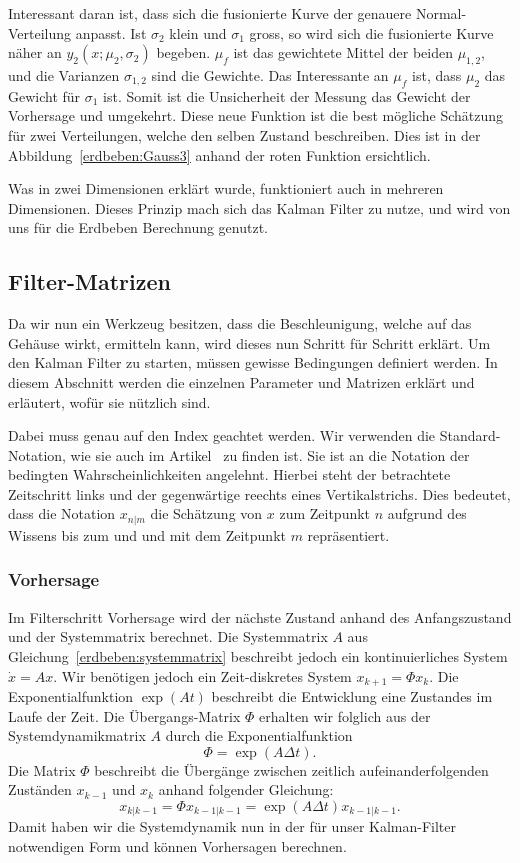 Interessant daran ist, dass sich die fusionierte Kurve der genauere Normal-Verteilung anpasst.
Ist ${\sigma_2}$ klein und ${\sigma_1}$ gross,
so wird sich die fusionierte Kurve näher an ${y_2}(x;{\mu_2},{\sigma_2})$ begeben.
$\mu_f$ ist das gewichtete Mittel der beiden $\mu_{1,2}$, und die Varianzen $\sigma_{1,2}$ sind die Gewichte.
Das Interessante an $\mu_{f}$ ist, dass ${\mu_2}$ das Gewicht für ${\sigma_1}$ ist. 
Somit ist die Unsicherheit der Messung das Gewicht der Vorhersage und umgekehrt.
Diese neue Funktion ist die best mögliche Schätzung für zwei Verteilungen, welche den selben Zustand beschreiben.
Dies ist in der Abbildung~\ref{erdbeben:Gauss3} anhand der roten Funktion ersichtlich. 

Was in zwei Dimensionen erklärt wurde, funktioniert auch in mehreren Dimensionen. 
Dieses Prinzip mach sich das Kalman Filter zu nutze, und wird von uns für die Erdbeben Berechnung genutzt. 

\subsection{Filter-Matrizen}
Da wir nun ein Werkzeug besitzen, dass die Beschleunigung, welche auf das Gehäuse wirkt, ermitteln kann, wird dieses nun Schritt für Schritt erklärt. 
Um den Kalman Filter zu starten, müssen gewisse Bedingungen definiert werden. 
In diesem Abschnitt werden die einzelnen Parameter und Matrizen erklärt und erläutert, wofür sie nützlich sind. 

Dabei muss genau auf den Index geachtet werden.
Wir verwenden die Standard-Notation, wie sie auch im Artikel~\cite{erdbeben:wikipedia} zu finden ist.
Sie ist an die Notation der bedingten Wahrscheinlichkeiten angelehnt.
Hierbei steht der betrachtete Zeitschritt links und der gegenwärtige reechts eines Vertikalstrichs.
Dies bedeutet, dass die Notation $x_{n|m}$ die Schätzung von $x$ zum Zeitpunkt $n$ aufgrund des Wissens bis zum und und mit dem Zeitpunkt $m$ repräsentiert.

\subsubsection*{Vorhersage}
Im Filterschritt Vorhersage wird der nächste Zustand anhand des Anfangszustand und der Systemmatrix berechnet. 
Die Systemmatrix $A$ aus Gleichung~\eqref{erdbeben:systemmatrix} beschreibt jedoch ein kontinuierliches System $\dot x = Ax$.
Wir benötigen jedoch ein Zeit-diskretes System $x_{k+1} = \Phi x_k$.
Die Exponentialfunktion $\exp(At)$ beschreibt die Entwicklung eine Zustandes im Laufe der Zeit.
Die Übergangs-Matrix $\Phi$ erhalten wir folglich aus der Systemdynamikmatrix $A$ durch die Exponentialfunktion
\[\Phi = \exp(A\Delta t). \]
Die Matrix $\Phi$ beschreibt die Übergänge zwischen zeitlich aufeinanderfolgenden Zuständen $x_{k-1}$ und $x_{k}$ anhand folgender Gleichung:
\[
{x_{k|k-1}}=\Phi{x_{k-1|k-1}}= \exp(A\Delta t){x_{k-1|k-1}}.
\] 
Damit haben wir die Systemdynamik nun in der für unser Kalman-Filter notwendigen Form und können Vorhersagen berechnen.

